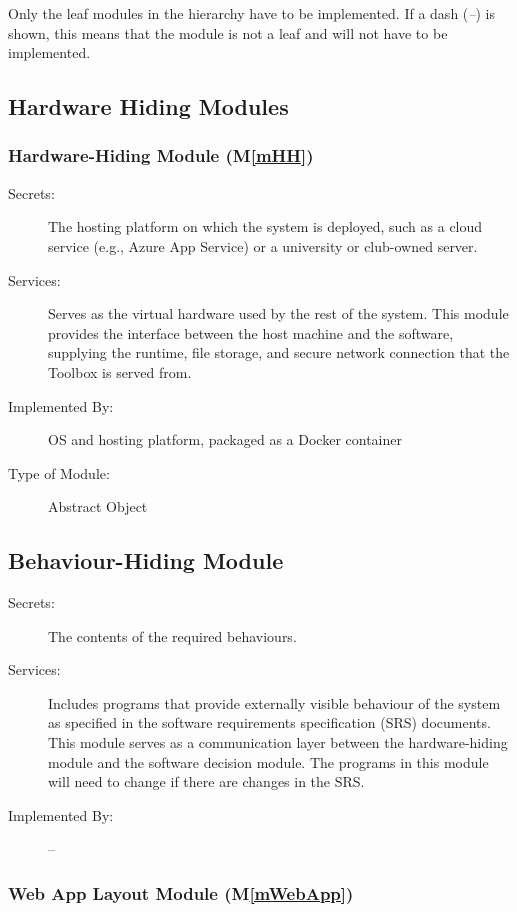 \documentclass[12pt, titlepage]{article}
\begin{document}
Only the leaf modules in the hierarchy have to be implemented. If a dash
(\emph{--}) is shown, this means that the module is not a leaf and will not have
to be implemented.

\subsection{Hardware Hiding Modules}

\subsubsection{Hardware-Hiding Module (M\ref*{mHH})}\label{mHH:dec}

\begin{description}
\item[Secrets:] The hosting platform on which the system is deployed, such as a cloud service (e.g., Azure App Service) or a university or club-owned server.
\item[Services:] Serves as the virtual hardware used by the rest of the system.
  This module provides the interface between the host machine and the software,
  supplying the runtime, file storage, and secure network connection that the
  Toolbox is served from.
\item[Implemented By:] OS and hosting platform, packaged as a Docker container
\item[Type of Module:] Abstract Object
\end{description}

\subsection{Behaviour-Hiding Module}

\begin{description}
\item[Secrets:] The contents of the required behaviours.
\item[Services:] Includes programs that provide externally visible behaviour of
  the system as specified in the software requirements specification (SRS)
  documents. This module serves as a communication layer between the
  hardware-hiding module and the software decision module. The programs in this
  module will need to change if there are changes in the SRS.
\item[Implemented By:] --
\end{description}

\subsubsection{Web App Layout Module (M\ref*{mWebApp})}\label{mWebApp:dec}
\end{document}

